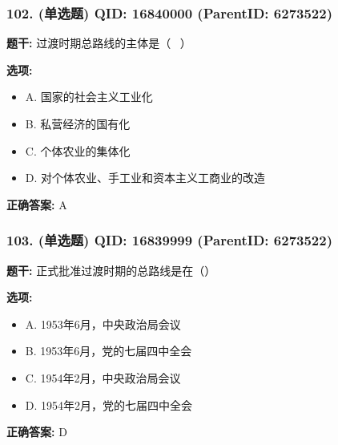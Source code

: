 \documentclass[12pt,UTF8]{ctexart}
\begin{document}
\vspace{0.3em}\hrulefill\vspace{0.7em}

\subsubsection*{102. (单选题) \small QID: 16840000 (ParentID: 6273522)}

\textbf{题干:}
过渡时期总路线的主体是（  ）



\textbf{选项:}
\begin{itemize}[leftmargin=*]

  \item A. 国家的社会主义工业化

  \item B. 私营经济的国有化

  \item C. 个体农业的集体化

  \item D. 对个体农业、手工业和资本主义工商业的改造

\end{itemize}

\textbf{正确答案:}
A

\vspace{0.3em}\hrulefill\vspace{0.7em}

\subsubsection*{103. (单选题) \small QID: 16839999 (ParentID: 6273522)}

\textbf{题干:}
正式批准过渡时期的总路线是在（）



\textbf{选项:}
\begin{itemize}[leftmargin=*]

  \item A. 1953年6月，中央政治局会议

  \item B. 1953年6月，党的七届四中全会

  \item C. 1954年2月，中央政治局会议

  \item D. 1954年2月，党的七届四中全会

\end{itemize}

\textbf{正确答案:}
D
\end{document}
